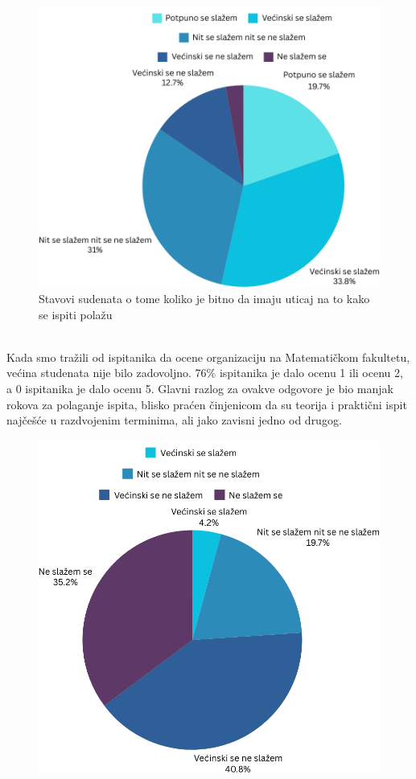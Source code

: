 \documentclass[a4paper]{article}
\begin{document}
{\begin{figure}[h!]
\begin{center}
    \includegraphics[scale = 0.3]{PieChartUticajNaPolaganje.png}
    \caption{Stavovi sudenata o tome koliko je bitno da imaju uticaj na to kako se ispiti polažu}
    \label{fig:uticaj}
\end{center}
\end{figure}\\
Kada smo tražili od ispitanika da ocene organizaciju na Matematičkom fakultetu, većina studenata nije bilo zadovoljno. 76\% ispitanika je dalo ocenu 1 ili ocenu 2, a 0 ispitanika je dalo ocenu 5. Glavni razlog za ovakve odgovore je bio manjak rokova za polaganje ispita, blisko praćen činjenicom da su teorija i praktični ispit najčešće u razdvojenim terminima, ali jako zavisni jedno od drugog.\\
\begin{figure}[h!]
\begin{center}
    \includegraphics[scale = 0.3]{PieChartOrganizacijaMatf.png}

\end{center}
\end{figure}}
\end{document}
